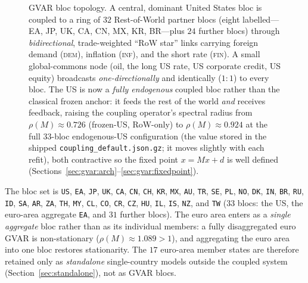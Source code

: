 \documentclass[11pt]{article}
\theoremstyle{definition}
\theoremstyle{remark}
\begin{document}
\begin{figure}[!ht]
\begin{tikzpicture}
\end{tikzpicture}
\caption{GVAR bloc topology. A central, dominant United States bloc is coupled to
a ring of $32$ Rest-of-World partner blocs (eight labelled---EA, JP, UK, CA, CN,
MX, KR, BR---plus $24$ further blocs) through \emph{bidirectional},
trade-weighted ``RoW star'' links carrying foreign demand (\textsc{dem}),
inflation (\textsc{inf}), and the short rate (\textsc{fin}). A small global-commons
node (oil, the long US rate, US corporate credit, US equity) broadcasts
\emph{one-directionally} and identically ($1\!:\!1$) to every bloc. The US is now a
\emph{fully endogenous} coupled bloc rather than the classical frozen anchor: it
feeds the rest of the world \emph{and} receives feedback, raising the coupling
operator's spectral radius from $\rho(M)\approx0.726$ (frozen-US, RoW-only) to
$\rho(M)\approx0.924$ at the full $33$-bloc endogenous-US configuration (the value
stored in the shipped \texttt{coupling\_default.json.gz}; it moves slightly with
each refit), both contractive so the fixed point $x = Mx + d$ is well defined
(Sections~\ref{sec:gvar:arch}--\ref{sec:gvar:fixedpoint}).}
\label{fig:gvar-topology}
\end{figure}

The bloc set is
\texttt{US}, \texttt{EA}, \texttt{JP}, \texttt{UK}, \texttt{CA},
\texttt{CN}, \texttt{CH}, \texttt{KR}, \texttt{MX}, \texttt{AU},
\texttt{TR}, \texttt{SE}, \texttt{PL}, \texttt{NO}, \texttt{DK},
\texttt{IN}, \texttt{BR}, \texttt{RU}, \texttt{ID}, \texttt{SA},
\texttt{AR}, \texttt{ZA}, \texttt{TH}, \texttt{MY}, \texttt{CL},
\texttt{CO}, \texttt{CR}, \texttt{CZ}, \texttt{HU}, \texttt{IL},
\texttt{IS}, \texttt{NZ}, and \texttt{TW}
($33$ blocs: the US, the euro-area aggregate \texttt{EA}, and $31$ further
blocs). The euro area enters as a \emph{single aggregate} bloc rather than as its
individual members: a fully disaggregated euro GVAR is non-stationary
($\rho(M)\approx 1.089 > 1$), and aggregating the euro area into one bloc
restores stationarity. The $17$ euro-area member states are therefore retained
only as \emph{standalone} single-country models outside the coupled system
(Section~\ref{sec:standalone}), not as GVAR blocs.
\end{document}
